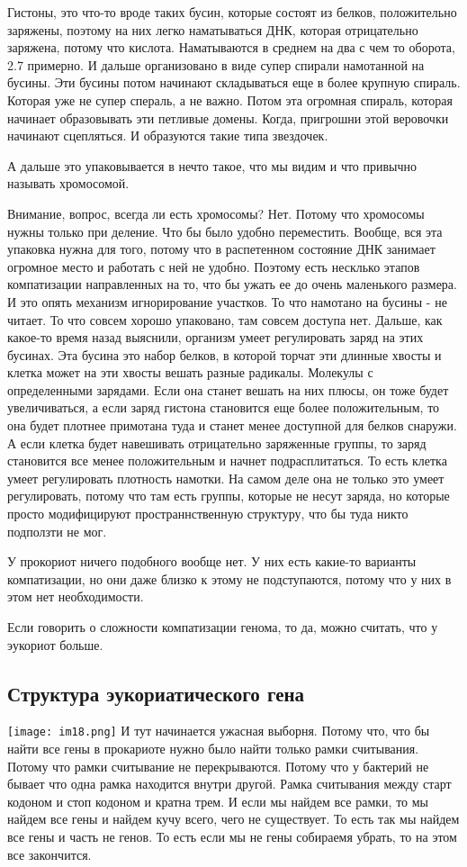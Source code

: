 Гистоны, это что-то вроде таких бусин, 
которые состоят из белков, положительно заряжены, 
поэтому на них легко наматываться ДНК, которая 
отрицательно заряжена, потому что кислота. Наматываются 
в среднем на два с чем то оборота, 2.7 примерно. И дальше организовано 
в виде супер спирали намотанной на бусины. Эти бусины потом начинают складываться еще 
в более крупную спираль. Которая уже не супер спераль, а не важно. Потом эта огромная 
спираль, которая начинает образовывать эти 
петливые домены. Когда, пригрошни этой веровочки начинают сцепляться. И образуются 
такие типа звездочек. 

А дальше это упаковывается в нечто такое, что мы видим и что привычно называть 
хромосомой. 

Внимание, вопрос, всегда ли есть хромосомы? 
Нет. Потому что хромосомы нужны только при деление. 
Что бы было удобно переместить. Вообще, вся эта упаковка нужна 
для того, потому что в распетенном состояние ДНК занимает огромное 
место и работать с ней не удобно. Поэтому есть несклько 
этапов компатизации направленных на то, 
что бы ужать ее до очень маленького размера. И это 
опять механизм игнорирование участков. То что намотано на бусины - не читает. 
То что совсем хорошо упаковано, там совсем доступа нет. Дальше, как какое-то 
время назад выяснили, организм умеет регулировать заряд на 
этих бусинах. Эта бусина это набор белков, 
в которой торчат эти длинные хвосты и клетка может на эти хвосты вешать 
разные радикалы. Молекулы с определенными зарядами. Если она станет 
вешать на них плюсы, он тоже будет увеличиваться, 
а если заряд гистона становится еще более положительным, то она будет 
плотнее примотана туда и станет менее доступной для белков снаружи. 
А если клетка будет навешивать отрицательно 
заряженные группы, то заряд становится все 
менее положительным и начнет подрасплитаться. То есть 
клетка умеет регулировать плотность намотки. 
На самом деле она не только это умеет регулировать, 
потому что там есть группы, которые не несут заряда, но 
которые просто модифицируют пространнственную 
структуру, что бы туда никто подползти не мог. 


У прокориот ничего подобного вообще нет. У них есть какие-то варианты 
компатизации, но они даже близко к этому не подступаются, 
потому что у них в этом нет необходимости. 

Если говорить о сложности компатизации генома, то да, 
можно считать, что у эукориот больше. 

\subsection{Структура эукориатического гена}
\texttt{[image: im18.png]}
И тут начинается ужасная выборня. Потому что, 
что бы найти все гены в прокариоте нужно было 
найти только рамки считывания. Потому что 
рамки считывание не перекрываются. Потому что 
у бактерий не бывает что одна рамка находится внутри другой. 
Рамка считывания между старт кодоном и стоп кодоном и кратна трем. 
И если мы найдем все рамки, то мы  найдем все гены и найдем кучу всего, 
чего не существует. То есть так мы найдем все гены и 
часть не генов. То есть если мы не гены собираемя убрать, то 
на этом все закончится. 

